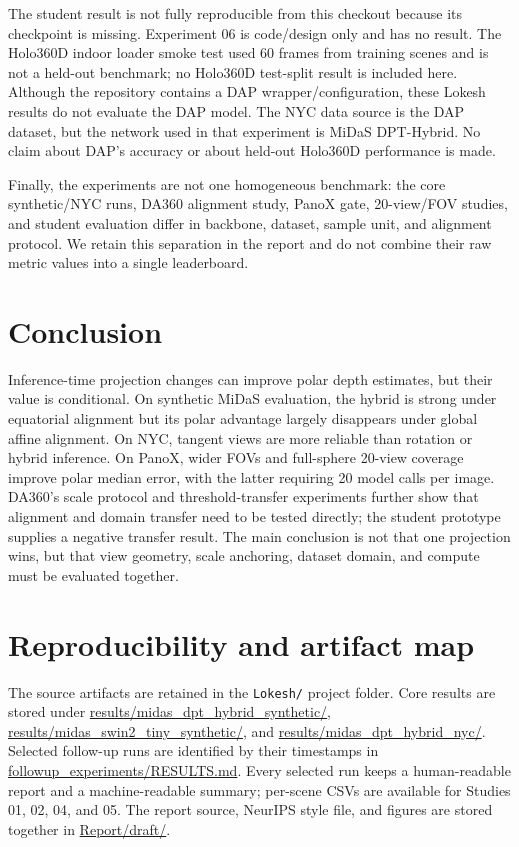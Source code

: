 \documentclass{article}
\begin{document}
The student result is not fully reproducible from this checkout because its checkpoint is missing. Experiment 06 is code/design only and has no result. The Holo360D indoor loader smoke test used 60 frames from training scenes and is not a held-out benchmark; no Holo360D test-split result is included here. Although the repository contains a DAP wrapper/configuration, these Lokesh results do not evaluate the DAP model. The NYC data source is the DAP dataset, but the network used in that experiment is MiDaS DPT-Hybrid. No claim about DAP's accuracy or about held-out Holo360D performance is made.

Finally, the experiments are not one homogeneous benchmark: the core synthetic/NYC runs, DA360 alignment study, PanoX gate, 20-view/FOV studies, and student evaluation differ in backbone, dataset, sample unit, and alignment protocol. We retain this separation in the report and do not combine their raw metric values into a single leaderboard.

\section{Conclusion}

Inference-time projection changes can improve polar depth estimates, but their value is conditional. On synthetic MiDaS evaluation, the hybrid is strong under equatorial alignment but its polar advantage largely disappears under global affine alignment. On NYC, tangent views are more reliable than rotation or hybrid inference. On PanoX, wider FOVs and full-sphere 20-view coverage improve polar median error, with the latter requiring 20 model calls per image. DA360's scale protocol and threshold-transfer experiments further show that alignment and domain transfer need to be tested directly; the student prototype supplies a negative transfer result. The main conclusion is not that one projection wins, but that view geometry, scale anchoring, dataset domain, and compute must be evaluated together.

\section*{Reproducibility and artifact map}

The source artifacts are retained in the \texttt{Lokesh/} project folder. Core results are stored under \url{results/midas_dpt_hybrid_synthetic/}, \url{results/midas_swin2_tiny_synthetic/}, and \url{results/midas_dpt_hybrid_nyc/}. Selected follow-up runs are identified by their timestamps in \url{followup_experiments/RESULTS.md}. Every selected run keeps a human-readable report and a machine-readable summary; per-scene CSVs are available for Studies 01, 02, 04, and 05. The report source, NeurIPS style file, and figures are stored together in \url{Report/draft/}.
\end{document}
